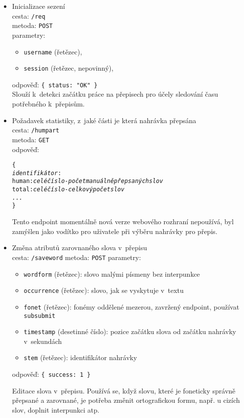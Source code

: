 \begin{itemize}
{    Verze se inkrementuje při každém příspěvku. Slouží k~tomu, aby se mohly cachovat
    transkripce, ale aby se cache nepoužila, pokud někdo přepis změnil.
}
\item{
    Inicializace sezení \\
    cesta: \texttt{/req} \\
    metoda: \texttt{POST} \\
    parametry:
    \begin{itemize}
        \item{\texttt{username} (řetězec),}
        \item{\texttt{session} (řetězec, nepovinný),}
    \end{itemize}
    odpověď: \texttt{\{ status: "OK" \}} \\

    Slouží k~detekci začátku práce na přepisech pro účely sledování času
    potřebného k~přepisům.
}
\item{
    Požadavek statistiky, z~jaké části je která nahrávka přepsána \\
    cesta: \texttt{/humpart} \\
    metoda: \texttt{GET} \\
    odpověď: \begin{alltt}\{
        {\em identifikátor}:
            human: {\em celé číslo - počet manuálně přepsaných slov}
            total: {\em celé číslo - celkový počet slov}
        {\em ...}
    \}\end{alltt}

    Tento endpoint momentálně nová verze webového rozhraní nepoužívá, byl
    zamýšlen jako vodítko pro uživatele při výběru nahrávky pro přepis.
}
\item{
    Změna atributů zarovnaného slova v~přepisu \\
    cesta: \texttt{/saveword}
    metoda: \texttt{POST}
    parametry:
    \begin{itemize}
        \item{\texttt{wordform} (řetězec): slovo malými písmeny bez interpunkce}
        \item{\texttt{occurrence} (řetězec): slovo, jak se vyskytuje v~textu}
        \item{\texttt{fonet} (řetězec): fonémy oddělené mezerou, zavržený endpoint, používat \texttt{subsubmit}}
        \item{\texttt{timestamp} (desetinné číslo): pozice začátku slova od začátku nahrávky v~sekundách}
        \item{\texttt{stem} (řetězec): identifikátor nahrávky}
    \end{itemize}
    odpověď: \texttt{\{ success: 1 \}}

    Editace slova v~přepisu. Používá se, když slovu, které je foneticky správně
    přepsané a zarovnané, je potřeba změnit ortografickou formu, např. u cizích
    slov, doplnit interpunkci atp.
}
\end{itemize}

